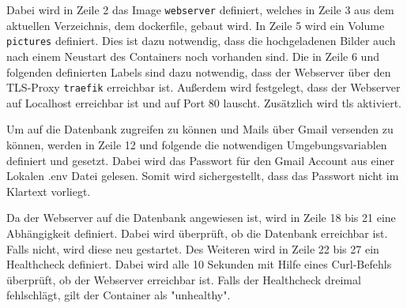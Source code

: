 Dabei wird in Zeile 2 das Image \lstinline|webserver| definiert, welches in Zeile 3 aus dem aktuellen Verzeichnis, dem dockerfile,
gebaut wird. In Zeile 5 wird ein Volume \lstinline|pictures| definiert. Dies ist dazu notwendig, dass die hochgeladenen Bilder
auch nach einem Neustart des Containers noch vorhanden sind. Die in Zeile 6 und folgenden definierten Labels sind dazu notwendig,
dass der Webserver über den TLS-Proxy \lstinline|traefik| erreichbar ist. Außerdem wird festgelegt, dass der Webserver auf
Localhost erreichbar ist und auf Port 80 lauscht. Zusätzlich wird tls aktiviert.

Um auf die Datenbank zugreifen zu können und Mails über Gmail versenden zu können, werden in Zeile 12 und folgende 
die notwendigen Umgebungsvariablen definiert und gesetzt. Dabei wird das Passwort für den Gmail Account aus einer
Lokalen .env Datei gelesen. Somit wird sichergestellt, dass das Passwort nicht im Klartext vorliegt.

Da der Webserver auf die Datenbank angewiesen ist, wird in Zeile 18 bis 21 eine Abhängigkeit definiert. Dabei
wird überprüft, ob die Datenbank erreichbar ist. Falls nicht, wird diese neu gestartet. Des Weiteren wird in Zeile 22 bis 27
ein Healthcheck definiert. Dabei wird alle 10 Sekunden mit Hilfe eines Curl-Befehls überprüft, ob der Webserver erreichbar ist.
Falls der Healthcheck dreimal fehlschlägt, gilt der Container als "unhealthy".